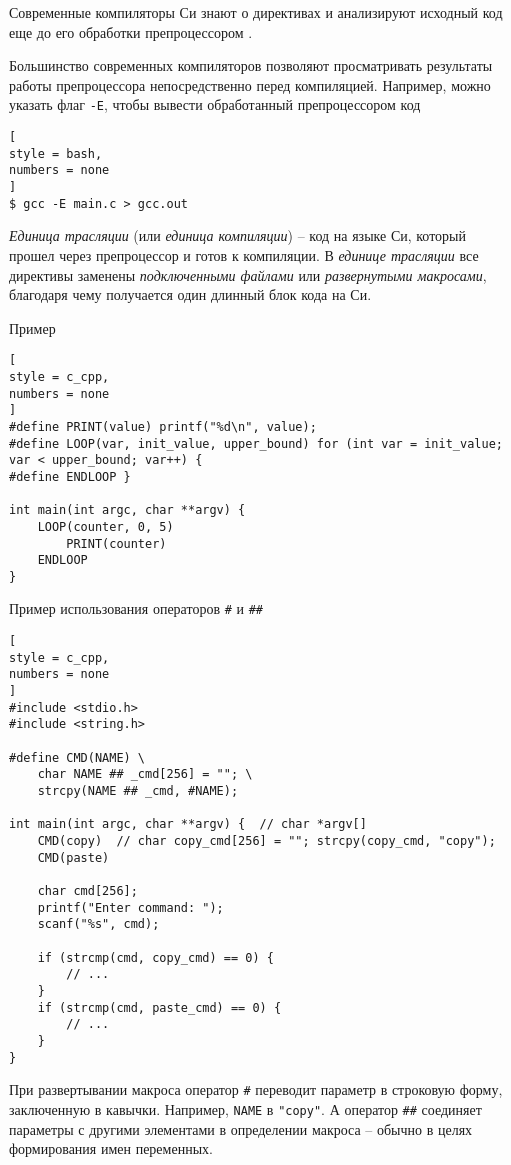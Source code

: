 \documentclass[%
	11pt,
	a4paper,
	utf8,
		]{article}
\begin{document}
Современные компиляторы Си знают о директивах и анализируют исходный код еще до его обработки препроцессором \cite[]{amini-extreme-c:2022}.

Большинство современных компиляторов позволяют просматривать результаты работы препроцессора непосредственно перед компиляцией. Например, можно указать флаг \verb|-E|, чтобы вывести обработанный препроцессором код
\begin{lstlisting}[
style = bash,
numbers = none
]
$ gcc -E main.c > gcc.out
\end{lstlisting}

\emph{Единица трасляции} (или \emph{единица компиляции}) -- код на языке Си, который прошел через препроцессор и готов к компиляции. В \emph{единице трасляции} все директивы заменены \emph{подключенными файлами} или \emph{развернутыми макросами}, благодаря чему получается один длинный блок кода на Си.

Пример
\begin{lstlisting}[
style = c_cpp,
numbers = none
]
#define PRINT(value) printf("%d\n", value);
#define LOOP(var, init_value, upper_bound) for (int var = init_value; var < upper_bound; var++) {
#define ENDLOOP }

int main(int argc, char **argv) {
    LOOP(counter, 0, 5)
        PRINT(counter)
    ENDLOOP
}
\end{lstlisting}

Пример использования операторов \verb|#| и \verb|##|
\begin{lstlisting}[
style = c_cpp,
numbers = none
]
#include <stdio.h>
#include <string.h>

#define CMD(NAME) \
    char NAME ## _cmd[256] = ""; \
    strcpy(NAME ## _cmd, #NAME);
    
int main(int argc, char **argv) {  // char *argv[]
    CMD(copy)  // char copy_cmd[256] = ""; strcpy(copy_cmd, "copy");
    CMD(paste)
    
    char cmd[256];
    printf("Enter command: ");
    scanf("%s", cmd);
    
    if (strcmp(cmd, copy_cmd) == 0) {
        // ...
    }
    if (strcmp(cmd, paste_cmd) == 0) {
        // ...
    }
}
\end{lstlisting}

При развертывании макроса оператор \verb|#| переводит параметр в строковую форму, заключенную в кавычки. Например, \verb|NAME| в \verb|"copy"|. А оператор \verb|##| соединяет параметры с другими элементами в определении макроса -- обычно в целях формирования имен переменных.
\end{document}
